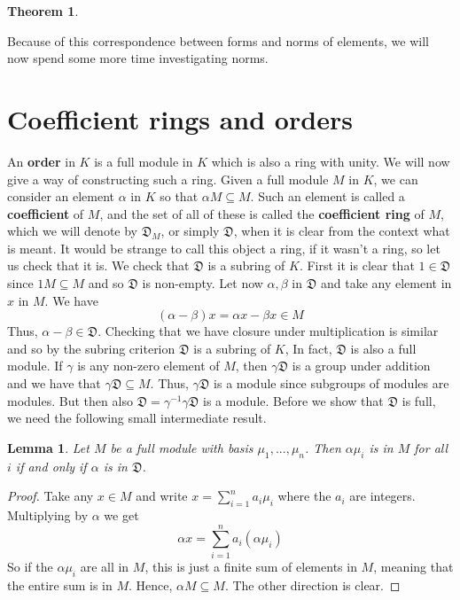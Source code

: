 \documentclass{article}
\newtheorem{theorem}{Theorem}[section]
\newtheorem{lemma}{Lemma}[section]
\newcommand{\mfrak}[1]{\mathfrak{#1}}
\begin{document}
\begin{theorem}
\end{theorem}

Because of this correspondence between forms and norms of elements, we will now spend some more time investigating norms. 

\section{Coefficient rings and orders}
An \textbf{order} in $K$ is a full module in $K$ which is also a ring with unity. We will now give a way of constructing such a ring. Given a full module $M$ in $K$, we can consider an element $\alpha$ in $K$ so that $\alpha M \subseteq M$. Such an element is called a \textbf{coefficient} of $M$, and the set of all of these is called the \textbf{coefficient ring} of $M$, which we will denote by $\mfrak D_M$, or simply $\mfrak D$, when it is clear from the context what is meant. It would be strange to call this object a ring, if it wasn't a ring, so let us check that it is. We check that $\mfrak D$ is a subring of $K$. First it is clear that $1 \in \mfrak{D}$ since $1 M \subseteq M$ and so $\mfrak{D}$ is non-empty. Let now $\alpha, \beta$ in $\mfrak D$ and take any element in $x$ in $M$. We have $$(\alpha - \beta)x = \alpha x - \beta x \in M$$
Thus, $\alpha - \beta \in \mfrak{D}$. Checking that we have closure under multiplication is similar and so by the subring criterion $\mfrak{D}$ is a subring of $K$, In fact, $\mfrak{D}$ is also a full module. If $\gamma$ is any non-zero element of $M$, then $\gamma \mfrak{D}$ is a group under addition and we have that $\gamma \mfrak{D} \subseteq M$. Thus, $\gamma \mfrak D$ is a module since subgroups of modules are modules. But then also $\mfrak{D} = \gamma^{-1} \gamma \mfrak{D}$ is a module. Before we show that $\mfrak D$ is full, we need the following small intermediate result.

\begin{lemma}\label{lem:SufficientConditionForCoefficient}
    Let $M$ be a full module with basis $\mu_1, ..., \mu_n$. Then $\alpha \mu_i$ is in $M$ for all $i$ if and only if $\alpha$ is in $\mfrak D$.
\end{lemma}
\begin{proof}
    Take any $x \in M$ and write $x = \sum_{i=1}^n a_i \mu_i$ where the $a_i$ are integers. Multiplying by $\alpha$ we get
    $$\alpha x = \sum_{i=1}^n a_i (\alpha \mu_i)$$
    So if the $\alpha \mu_i$ are all in $M$, this is just a finite sum of elements in $M$, meaning that the entire sum is in $M$. Hence, $\alpha M \subseteq M$. The other direction is clear. 
\end{proof}
\end{document}
